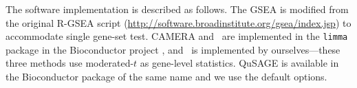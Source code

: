 	
	The software implementation is described as follows. The GSEA is modified from the original 
	R-GSEA script (\url{http://software.broadinstitute.org/gsea/index.jsp}) to accommodate single 
	gene-set test. CAMERA and \genr~are implemented in the \verb|limma| package 
	\citep{smyth2005limma} in the Bioconductor project \citep{gentleman2004bioconductor}, and 
	\gent~is implemented by ourselves---these three methods use moderated-$t$ as gene-level 
	statistics. QuSAGE is 
	available in the Bioconductor package of the same name and we use the default options. 
	

	
	
